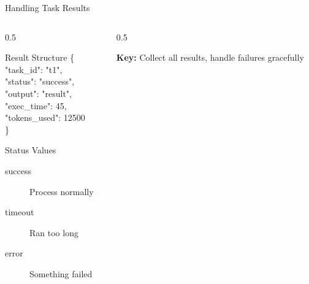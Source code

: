 \documentclass[aspectratio=169,11pt]{beamer}
\begin{document}
\begin{frame}{Handling Task Results}
\begin{columns}[T]
\begin{column}{0.5\textwidth}
\begin{block}{Result Structure}
{\scriptsize\ttfamily
\{\\
\hspace{1em}"task\_id": "t1",\\
\hspace{1em}"status": "success",\\
\hspace{1em}"output": "result",\\
\hspace{1em}"exec\_time": 45,\\
\hspace{1em}"tokens\_used": 12500\\
\}
}
\end{block}

\begin{block}{Status Values}
\begin{description}
    \item[success] Process normally
    \item[timeout] Ran too long
    \item[error] Something failed
\end{description}
\end{block}
\end{column}
\begin{column}{0.5\textwidth}
\begin{center}
\end{center}

\textbf{Key:} Collect all results, handle failures gracefully
\end{column}
\end{columns}
\end{frame}
\end{document}
